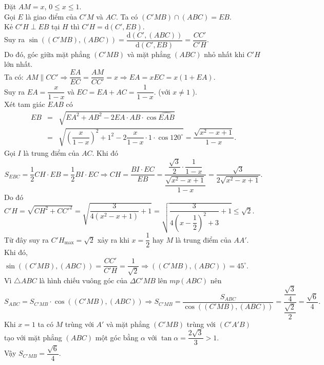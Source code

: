 \begin{vd}[VDC]
{		Đặt $AM=x$, $0\le x\le 1$.\\
		Gọi $E$ là giao điểm của $C'M$ và $AC$. Ta có $(C'MB)\cap (ABC)=EB$.\\
		Kẻ $C'H\perp EB$ tại $H$ thì $C'H=\mathrm{d}(C',EB)$.\\
		Suy ra $\sin ((C'MB),(ABC))=\dfrac {\mathrm{d}(C',(ABC))}{\mathrm{d}(C',EB)}=\dfrac {CC'}{C'H}$.\\
		Do đó, góc giữa mặt phẳng $(C'MB)$ và mặt phẳng $(ABC)$ nhỏ nhất khi $C'H$ lớn nhất.\\
		Ta có: $AM\parallel CC'\Rightarrow \dfrac {EA}{EC}=\dfrac {AM}{CC'}=x\Rightarrow EA=xEC=x(1+EA)$.\\
		Suy ra $EA=\dfrac {x}{1-x}$ và $EC=EA+AC=\dfrac {1}{1-x}$. (với $ x\ne 1$ ).\\
		Xét tam giác $EAB$ có
		\begin{eqnarray*}
			EB&=&\sqrt {EA^2+AB^2-2EA\cdot AB\cdot \cos \widehat{EAB}}\\ 
			&=&\sqrt {\left( \dfrac {x}{1-x} \right)^2+1^2-2\dfrac {x}{1-x}\cdot 1\cdot \cos 120^\circ }=\dfrac {\sqrt {x^2-x+1}}{1-x}. 
		\end{eqnarray*}
		Gọi $I$ là trung điểm của $AC$. Khi đó
		$$S_{EBC}=\dfrac {1}{2}CH\cdot EB=\dfrac {1}{2}BI\cdot EC\Rightarrow CH=\dfrac {BI\cdot EC}{EB}=\dfrac {\dfrac {\sqrt {3}}{2}\cdot \dfrac {1}{1-x}}{\dfrac {\sqrt {x^2-x+1}}{1-x}}=\dfrac {\sqrt {3}}{2\sqrt {x^2-x+1}}.$$
		Do đó $C'H=\sqrt {CH^2+CC'^2}=\sqrt {\dfrac {3}{4(x^2-x+1)}+1}=\sqrt {\dfrac {3}{4\left( x-\dfrac {1}{2} \right)^2+3}+1}\le \sqrt {2}$.\\
		Từ đây suy ra $C'H_{\max}=\sqrt {2}$ xảy ra khi $x=\dfrac {1}{2}$ hay $M$ là trung điểm của $AA'$.\\
		Khi đó, $\sin \left((C'MB),(ABC)\right)=\dfrac {CC'}{C'H}=\dfrac {1}{\sqrt {2}}\Rightarrow \left((C'MB),(ABC)\right)=45^\circ$.\\
		Vì $\triangle ABC$ là hình chiếu vuông góc của $\Delta C'MB$ lên $ mp(ABC)$ nên
		$$S_{ABC}=S_{C'MB}\cdot \cos \left(({C}'MB),(ABC)\right)\Rightarrow S_{C'MB}=\dfrac {S_{ABC}}{\cos \left((C'MB),(ABC)\right)}=\dfrac {\dfrac{\sqrt {3}}{4}}{\dfrac{\sqrt {2}}{2}}=\dfrac {\sqrt {6}}{4}.$$
		Khi $ x=1$ ta có $M$ trùng với $A'$ và mặt phẳng $(C'MB)$ trùng với $(C'A'B)$ tạo với mặt phẳng $(ABC)$ một góc bằng $\alpha $ với $\tan \alpha =\dfrac {2\sqrt {3}}{3}>1$.\\
		Vậy $S_{C'MB}=\dfrac {\sqrt {6}}{4}$.
	}
\end{vd}
